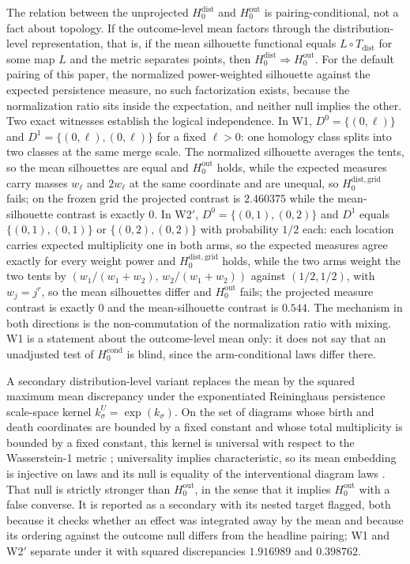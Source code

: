 The relation between the unprojected $H_0^{\mathrm{dist}}$ and $H_0^{\mathrm{out}}$ is pairing-conditional, not a fact about topology. If the
outcome-level mean factors through the distribution-level representation, that is, if the mean
silhouette functional equals $L \circ T_{\mathrm{dist}}$ for some map $L$ and the metric separates
points, then $H_0^{\mathrm{dist}} \Rightarrow H_0^{\mathrm{out}}$. For the default pairing of this
paper, the normalized power-weighted silhouette against the expected persistence measure, no such
factorization exists, because the normalization ratio sits inside the expectation, and neither
null implies the other. Two exact witnesses establish the logical independence. In W1,
$D^0 = \{(0,\ell)\}$ and $D^1 = \{(0,\ell),(0,\ell)\}$ for a fixed $\ell>0$: one homology class
splits into two classes at the same merge scale. The normalized silhouette averages the tents, so
the mean silhouettes are equal and $H_0^{\mathrm{out}}$ holds, while the expected measures carry
masses $w_\ell$ and $2w_\ell$ at the same coordinate and are unequal, so
$H_0^{\mathrm{dist,grid}}$ fails; on the frozen grid the projected contrast is $2.460375$ while
the mean-silhouette contrast is exactly $0$. In W2$'$, $D^0 = \{(0,1),(0,2)\}$ and $D^1$ equals
$\{(0,1),(0,1)\}$ or $\{(0,2),(0,2)\}$ with probability $1/2$ each: each location carries expected
multiplicity one in both arms, so the expected measures agree exactly for every weight power and
$H_0^{\mathrm{dist,grid}}$ holds, while the two arms weight the two tents by
$(w_1/(w_1+w_2),\, w_2/(w_1+w_2))$ against $(1/2,1/2)$, with $w_j = j^r$, so the mean silhouettes
differ and $H_0^{\mathrm{out}}$ fails; the projected measure contrast is exactly $0$ and the
mean-silhouette contrast is $0.544$. The mechanism in both directions is the non-commutation of
the normalization ratio with mixing. W1 is a statement about the outcome-level mean only: it does
not say that an unadjusted test of $H_0^{\mathrm{cond}}$ is blind, since the arm-conditional laws
differ there.

A secondary distribution-level variant replaces the mean by the squared maximum mean discrepancy
under the exponentiated Reininghaus persistence scale-space kernel
$k^U_\sigma = \exp(k_\sigma)$. On the set of diagrams whose birth and death coordinates are
bounded by a fixed constant and whose total multiplicity is bounded by a fixed constant, this
kernel is universal with respect to the Wasserstein-1 metric \cite{kwitt_neurips_2015};
universality implies characteristic, so its mean embedding is injective on laws and its null is
equality of the interventional diagram laws \cite{gretton_2012}. That null is strictly stronger
than $H_0^{\mathrm{out}}$, in the sense that it implies $H_0^{\mathrm{out}}$ with a false converse.
It is reported as a secondary with its nested target flagged, both because it checks whether an
effect was integrated away by the mean and because its ordering against the outcome null differs
from the headline pairing; W1 and W2$'$ separate under it with squared discrepancies $1.916989$
and $0.398762$.

